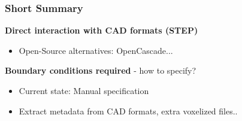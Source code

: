 \begin{frame}
	\frametitle{Short Summary}
	\begin{minipage}{0.85\textwidth}
	\textbf{Direct interaction with CAD formats (STEP)}	
		\begin{itemize}
		\item Open-Source alternatives: OpenCascade...
		\end{itemize}
	\textbf{Boundary conditions required} - how to specify?
		\begin{itemize}
		\item Current state: Manual specification
		\item Extract metadata from CAD formats, extra voxelized files..
		\end{itemize}
		
	\end{minipage}
	\begin{minipage}{0.14\textwidth}
		\begin{figure}
			\\

\end{figure}
\end{minipage}
\end{frame}
